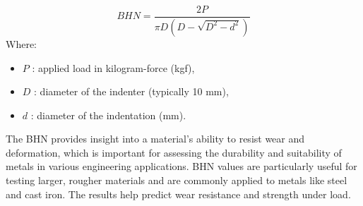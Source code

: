 \documentclass{article}
\begin{document}
\begin{equation}
    BHN = \frac{2P}{\pi D (D - \sqrt{D^2 - d^2})}
\end{equation}
Where:
\begin{itemize}[itemsep=-1mm]
    \item \( P \) : applied load in kilogram-force (kgf),
    \item \( D \) : diameter of the indenter (typically 10 mm),
    \item \( d \) : diameter of the indentation (mm).
\end{itemize}
The BHN provides insight into a material's ability to resist wear and deformation, which is important for assessing the durability and suitability of metals in various engineering applications. BHN values are particularly useful for testing larger, rougher materials and are commonly applied to metals like steel and cast iron. The results help predict wear resistance and strength under load.
\end{document}
